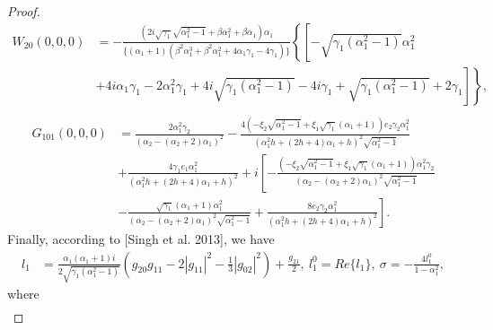 \documentclass{ws-ijbc}
\begin{document}
\begin{proof}
\begin{align*}
W_{20}(0,0,0)&=-\frac{(2i \sqrt{\gamma_{1}}\sqrt{\alpha_{1}^{2}-1}+\beta\alpha_{1}^{2}+\beta \alpha_{1}) \alpha_{1} }{\{\left(\alpha_{1}+1\right)
\left(\beta^{2}\alpha_{1}^{3}+\beta^{2}\alpha_{1}^{2}+4 \alpha_{1} \gamma_{1}-4 \gamma_{1}\right)\}}
\left\{\left[-\sqrt{\gamma_{1} \left(\alpha_{1}^{2}-1\right)}\alpha_{1}^{2}\right.\right.\\
&\left.\left.+4i\alpha_{1} \gamma_{1}-2 \alpha_{1}^{2} \gamma_{1}
+4 i \sqrt{\gamma_{1}
\left(\alpha_{1}^{2}-1\right)}
-4i \gamma_{1}+\sqrt{\gamma_{1} \left(\alpha_{1}^{2}-1\right)}+2 \gamma_{1}\right]\right\},\\
\end{align*}
\begin{equation*}
\begin{aligned}
G_{101}(0,0,0)&=\frac{2\alpha_{1}^{2} \gamma_{2}}{\left(\alpha_{2}-\left(\alpha_{2}+2\right) \alpha_{1}\right)^{2}}-\frac{4 \left(-\xi_{2} \sqrt{\alpha_{1}^{2}-1}+\xi_{1} \sqrt{\gamma_{1}} \left(\alpha_{1}+1\right)\right) e_{2} \gamma_{2} \alpha_{1}^{2}}{\left(\alpha_{1}^{2} h +\left(2 h +4\right) \alpha_{1}+h \right)^{2} \sqrt{\alpha_{1}^{2}-1}}\\
&+\frac{4 \gamma_{1} e_{1} \alpha_{1}^{2}}{\left(\alpha_{1}^{2} h +\left(2 h +4\right) \alpha_{1}+h \right)^{2}}+i\left[-\frac{\left(-\xi_{2} \sqrt{\alpha_{1}^{2}-1}+\xi_{1} \sqrt{\gamma_{1}}\left(\alpha_{1}+1\right)\right) \alpha_{1}^{2} \gamma_{2}}{\left(\alpha_{2}-\left(\alpha_{2}+2\right) \alpha_{1}\right)^{2} \sqrt{\alpha_{1}^{2}-1}}\right.\\
&\left.-\frac{\sqrt{\gamma_{1}} \left(\alpha_{1}+1\right) \alpha_{1}^{2}}{\left(\alpha_{2}-\left(\alpha_{2}+2\right) \alpha_{1}\right)^{2} \sqrt{\alpha_{1}^{2}-1}}+\frac{8 e_{2} \gamma_{2} \alpha_{1}^{2}}{\left(\alpha_{1}^{2} h +\left(2 h +4\right) \alpha_{1}+h \right)^{2}}\right].
\end{aligned}
               \end{equation*}
Finally, according to [Singh et al. 2013], we have
\begin{equation*}\label{eq481}
\begin{aligned}
l_{1}&=\frac{\alpha_{1}(\alpha_{1}+1)i}{2\sqrt{\gamma_{1}(\alpha_{1}^2-1)}}\left(g_{20}g_{11}-2|g_{11}|^{2}-\frac{1}{3}|g_{02}|^{2}\right)+\frac{g_{21}}{2},~l_{1}^{0}=Re\{l_{1}\},~\sigma=-\frac{4 l_{1}^{0}}{1-\alpha_{1}^2},\end{aligned}
\end{equation*}
where
\begin{equation*}
\begin{aligned}

\end{aligned}
\end{equation*}
\end{proof}
\end{document}

